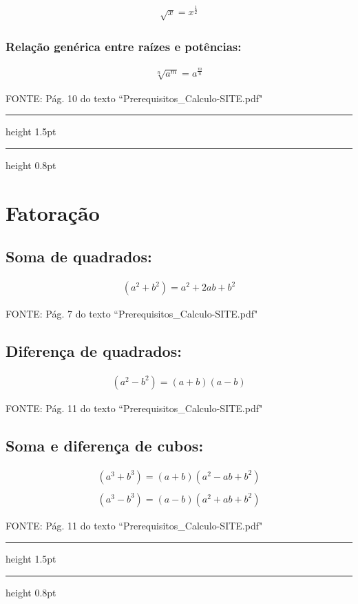 \documentclass[portuguese,a4paper,12pt,onecolumn,fleqn]{article}
\newcommand{\myline}{\par
  \kern3pt %
  \hrule height 1.5pt
  \kern2pt %
  \hrule height 0.8pt
  \kern3pt %
}
\begin{document}
\begin{gather*}
\sqrt{x}  = x^\frac{1}{2}
\end{gather*}

\subsubsection*{Relação genérica entre raízes e potências:}
\begin{gather*}
\sqrt[n]{a^m} = a^\frac{m}{n}
\end{gather*}

FONTE: Pág. 10 do texto ``Prerequisitos\_Calculo-SITE.pdf"

\myline	%

\section*{Fatoração}

\subsection*{Soma de quadrados:}
\begin{gather*}
(a^2 + b^2) = a^2 + 2ab + b^2
\end{gather*}

FONTE: Pág. 7 do texto ``Prerequisitos\_Calculo-SITE.pdf"

\subsection*{Diferença de quadrados:}
\begin{gather*}
(a^2 - b^2) = (a + b)(a - b)
\end{gather*}

FONTE: Pág. 11 do texto ``Prerequisitos\_Calculo-SITE.pdf"

\subsection*{Soma e diferença de cubos:}
\begin{gather*}
(a^3 + b^3) = (a + b)(a^2 - ab + b^2)
\\
\\
(a^3 - b^3) = (a - b)(a^2 + ab + b^2)
\end{gather*}

FONTE: Pág. 11 do texto ``Prerequisitos\_Calculo-SITE.pdf"

\myline	%
\end{document}
